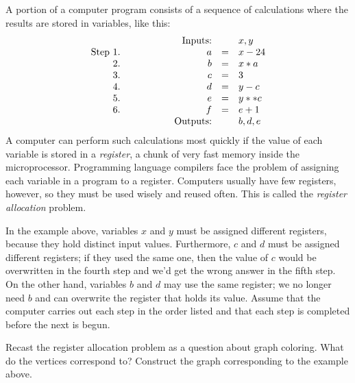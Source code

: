 \documentclass[12pt,twoside]{article}
\begin{document}

\newpage



\begin{problem}{10} 
A portion of a computer program consists of a sequence of calculations
where the results are stored in variables, like this:
\[
\begin{array}{rrrcl}
&& \text{Inputs:} &  & x, y \\
\text{Step } 1. & \hspace{0.5in} & a & = & x - 24 \\
2. && b & = & x * a \\
3. && c & = & 3 \\
4. && d & = & y - c \\
5. && e & = & y ** c \\
6. && f & = & e + 1  \\
&& \text{Outputs:} & & b, d, e
\end{array}
\]
A computer can perform such calculations most quickly if the value of
each variable is stored in a \emph{register}, a chunk of very fast
memory inside the microprocessor.  Programming language compilers face
the problem of assigning each variable in a program to a register.
Computers usually have few registers, however, so they must be used
wisely and reused often.  This is called the \emph{register
  allocation} problem.

In the example above, variables $x$ and $y$ must be assigned different
registers, because they hold distinct input values.  Furthermore, $c$
and $d$ must be assigned different registers; if they used the same
one, then the value of $c$ would be overwritten in the fourth step and
we'd get the wrong answer in the fifth step.  On the other hand,
variables $b$ and $d$ may use the same register; we no longer need $b$ and can overwrite the register that holds its
value.  Assume that the computer carries out each step in the order
listed and that each step is completed before the next is begun.

\bparts

 Recast the register allocation problem as a question
about graph coloring.  What do the vertices correspond to?  Construct
the graph corresponding to the example above.

\end{problem}
\end{document}

